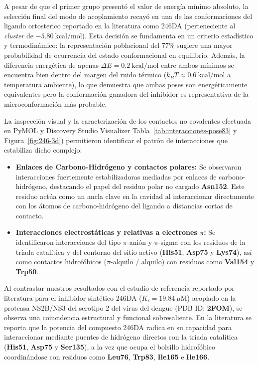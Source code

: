 A pesar de que el primer grupo presentó el valor de energía mínimo absoluto, la selección final del modo de acoplamiento recayó en una de las conformaciones del ligando ortosterico reportado en la literatura como 246DA (perteneciente al \textit{cluster} de $-5.80\ \text{kcal/mol}$). Esta decisión se fundamenta en un criterio estadístico y termodinámico: la representación poblacional del 77\% sugiere una mayor probabilidad de ocurrencia del estado conformacional en equilibrio. Además, la diferencia energética de apenas $\Delta E = 0.2\ \text{kcal/mol}$ entre ambos mínimos se encuentra bien dentro del margen del ruido térmico ($k_B T \approx 0.6\ \text{kcal/mol}$ a temperatura ambiente), lo que demuestra que ambas poses son energéticamente equivalentes pero la conformación ganadora del inhibidor  es representativa de la microconformación más probable.

La inspección visual y la caracterización de los contactos no covalentes efectuada en PyMOL y Discovery Studio Visualizer Tabla~\ref{tab:interacciones-pose83} y Figura~\ref{fig:246-3d}) permitieron identificar el patrón de interacciones que estabiliza dicho complejo:

\begin{itemize}
    \item \textbf{Enlaces de Carbono-Hidrógeno y contactos polares:} Se observaron interacciones fuertemente estabilizadoras mediadas por enlaces de carbono-hidrógeno, destacando el papel del residuo polar no cargado \textbf{Asn152}. Este residuo actúa como un ancla clave en la cavidad al interaccionar directamente con los átomos de carbono-hidrógeno del ligando a distancias cortas de contacto.
    \item \textbf{Interacciones electrostáticas y relativas a electrones $\pi$:} Se identificaron interacciones del tipo $\pi$-anión y $\pi$-sigma con los residuos de la tríada catalítica y del contorno del sitio activo (\textbf{His51}, \textbf{Asp75} y \textbf{Lys74}), así como contactos hidrofóbicos ($\pi$-alquilo / alquilo) con residuos como \textbf{Val154} y \textbf{Trp50}.
\end{itemize}

Al contrastar nuestros resultados con el estudio de referencia reportado por literatura para el inhibidor sintético 246DA ($K_i = 19.84\ \mu\text{M}$) acoplado en la proteasa NS2B/NS3 del serotipo 2 del virus del dengue (PDB ID: \textbf{2FOM}), se observa una coincidencia estructural y funcional sobresaliente. En la literatura se reporta que la potencia del compuesto 246DA radica en su capacidad para interaccionar mediante puentes de hidrógeno directos con la tríada catalítica (\textbf{His51}, \textbf{Asp75} y \textbf{Ser135}), a la vez que ocupa el bolsillo hidrofóbico coordinándose con residuos como \textbf{Leu76}, \textbf{Trp83}, \textbf{Ile165} e \textbf{Ile166}. 

